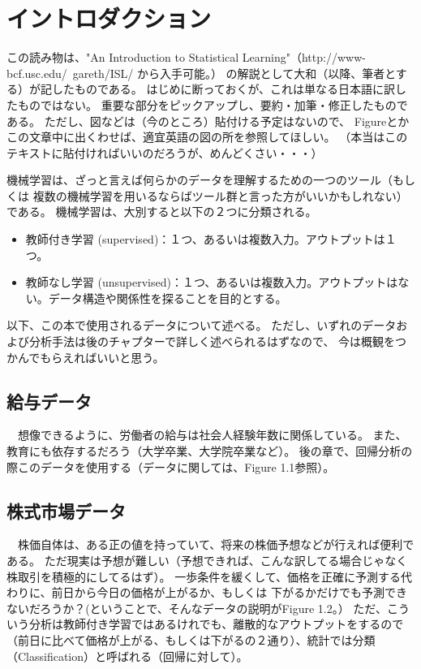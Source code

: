 \documentclass{jsarticle}
\begin{document}
%
\setlength{\baselineskip}{2em} %
\setcounter{section}{0}
\section{イントロダクション}
この読み物は、"An Introduction to Statistical Learning"（http://www-bcf.usc.edu/~gareth/ISL/ から入手可能。）
の解説として大和（以降、筆者とする）が記したものである。
はじめに断っておくが、これは単なる日本語に訳したものではない。
重要な部分をピックアップし、要約・加筆・修正したものである。
ただし、図などは（今のところ）貼付ける予定はないので、
Figureとかこの文章中に出くわせば、適宜英語の図の所を参照してほしい。
（本当はこのテキストに貼付ければいいのだろうが、めんどくさい・・・）

機械学習は、ざっと言えば何らかのデータを理解するための一つのツール（もしくは
複数の機械学習を用いるならばツール群と言った方がいいかもしれない）である。
機械学習は、大別すると以下の２つに分類される。
\begin{itemize}
\item 教師付き学習 (supervised)：１つ、あるいは複数入力。アウトプットは１つ。
\item 教師なし学習 (unsupervised)：１つ、あるいは複数入力。アウトプットはない。データ構造や関係性を探ることを目的とする。
\end{itemize}

以下、この本で使用されるデータについて述べる。
ただし、いずれのデータおよび分析手法は後のチャプターで詳しく述べられるはずなので、
今は概観をつかんでもらえればいいと思う。

\subsection{給与データ}
　想像できるように、労働者の給与は社会人経験年数に関係している。
また、教育にも依存するだろう（大学卒業、大学院卒業など）。
後の章で、回帰分析の際このデータを使用する（データに関しては、Figure 1.1参照）。

\subsection{株式市場データ}
　株価自体は、ある正の値を持っていて、将来の株価予想などが行えれば便利である。
ただ現実は予想が難しい（予想できれば、こんな訳してる場合じゃなく株取引を積極的にしてるはず）。
一歩条件を緩くして、価格を正確に予測する代わりに、前日から今日の価格が上がるか、もしくは
下がるかだけでも予測できないだろうか？(ということで、そんなデータの説明がFigure 1.2。）
ただ、こういう分析は教師付き学習ではあるけれでも、離散的なアウトプットをするので
（前日に比べて価格が上がる、もしくは下がるの２通り）、統計では分類（Classification）と呼ばれる（回帰に対して）。
\end{document}
